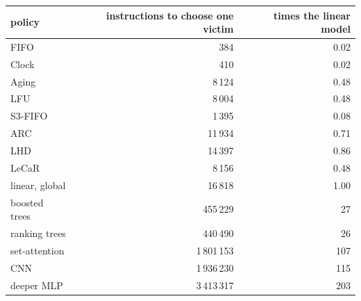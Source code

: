 \begin{tabular}{lrr}
\toprule
policy & instructions to choose one victim & times the linear model \\
\midrule
FIFO & 384 & 0.02 \\
Clock & 410 & 0.02 \\
Aging & 8\,124 & 0.48 \\
LFU & 8\,004 & 0.48 \\
S3-FIFO & 1\,395 & 0.08 \\
ARC & 11\,934 & 0.71 \\
LHD & 14\,397 & 0.86 \\
LeCaR & 8\,156 & 0.48 \\
linear, global & 16\,818 & 1.00 \\
boosted trees & 455\,229 & 27 \\
ranking trees & 440\,490 & 26 \\
set-attention & 1\,801\,153 & 107 \\
CNN & 1\,936\,230 & 115 \\
deeper MLP & 3\,413\,317 & 203 \\
\bottomrule
\end{tabular}
